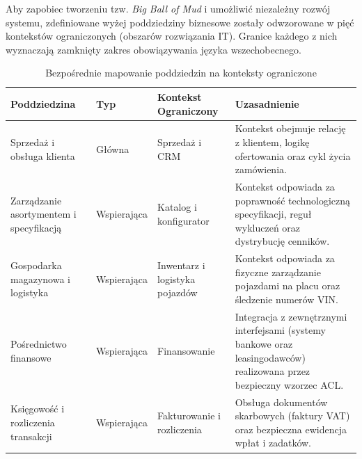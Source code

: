 Aby zapobiec tworzeniu tzw. \textit{Big Ball of Mud} i umożliwić niezależny rozwój systemu, zdefiniowane wyżej poddziedziny biznesowe zostały odwzorowane w pięć kontekstów ograniczonych (obszarów rozwiązania IT). Granice każdego z nich wyznaczają zamknięty zakres obowiązywania języka wszechobecnego.

\begin{table}[H]
\centering
\small
\renewcommand{\arraystretch}{1.3}

\begin{tabular}{|p{3.2cm}|p{2cm}|p{3.5cm}|p{5.3cm}|}
\hline

\textbf{Poddziedzina} &
\textbf{Typ} &
\textbf{Kontekst Ograniczony} &
\textbf{Uzasadnienie}
\\
\hline

Sprzedaż i obsługa klienta &
Główna &
Sprzedaż i CRM &
Kontekst obejmuje relację z klientem, logikę ofertowania oraz cykl życia zamówienia.
\\
\hline

Zarządzanie asortymentem i specyfikacją &
Wspierająca &
Katalog i konfigurator &
Kontekst odpowiada za poprawność technologiczną specyfikacji, reguł wykluczeń oraz dystrybucję cenników.
\\
\hline

Gospodarka magazynowa i logistyka &
Wspierająca &
Inwentarz i logistyka pojazdów &
Kontekst odpowiada za fizyczne zarządzanie pojazdami na placu oraz śledzenie numerów VIN.
\\
\hline

Pośrednictwo finansowe &
Wspierająca &
Finansowanie &
Integracja z zewnętrznymi interfejsami (systemy bankowe oraz leasingodawców) realizowana przez bezpieczny wzorzec ACL.
\\
\hline

Księgowość i rozliczenia transakcji &
Wspierająca &
Fakturowanie i rozliczenia &
Obsługa dokumentów skarbowych (faktury VAT) oraz bezpieczna ewidencja wpłat i zadatków.
\\
\hline

\end{tabular}

\caption{Bezpośrednie mapowanie poddziedzin na konteksty ograniczone}
\label{tab:ddd_mapping}

\end{table}